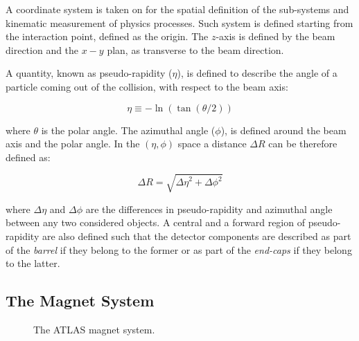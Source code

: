 			A coordinate system is taken on for the spatial definition of the sub-systems %
			and kinematic measurement of physics processes. Such system is defined starting from the interaction point, defined as the origin. The $z$-axis is defined by the beam direction and the $x-y$ plan, as transverse to the beam direction.

			A quantity, known as pseudo-rapidity ($\eta$), is defined to describe the angle of a particle coming out of the collision, with respect to the beam axis: 

			\begin{equation*}
				\eta \equiv -\ln (\tan(\theta/2))
			\end{equation*}

			\noindent where $\theta$ is the polar angle. The azimuthal angle ($\phi$), is defined around the beam axis and the polar angle. In the $(\eta,\phi)$ space a distance $\Delta R$ can be therefore defined as:  
			
			\begin{equation*}
				\Delta R = \sqrt{{\Delta \eta}^2 + {\Delta \phi}^2}
			\end{equation*}

			\noindent where $\Delta \eta$ and $\Delta \phi$ are the differences in pseudo-rapidity and azimuthal angle between any two considered objects. A central and a forward region of pseudo-rapidity are also defined such that the detector components are described as part of the \emph{barrel} if they belong to the former or as part of the \emph{end-caps} if they belong to the latter. 



		\subsection{The Magnet System}
		\label{sec:magnet-system}
			
			\begin{figure}[!htb]
					\hfill
				\caption{The \ac{ATLAS} magnet system.}
			\end{figure}

